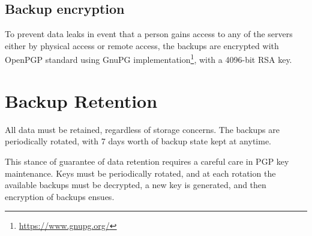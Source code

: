 \documentclass{article}
\begin{document}
\subsection{Backup encryption}

To prevent data leaks in event that a person gains access to any of the servers either by physical access or remote access, the backups are encrypted with OpenPGP standard using GnuPG implementation\footnote{\url{https://www.gnupg.org/}}, with a 4096-bit RSA key.

\section{Backup Retention}

All data must be retained, regardless of storage concerns. The backups are periodically rotated, with 7 days worth of backup state kept at anytime. 

This stance of guarantee of data retention requires a careful care in PGP key maintenance. Keys must be periodically rotated, and at each rotation the available backups must be decrypted, a new key is generated, and then encryption of backups ensues.
\end{document}
